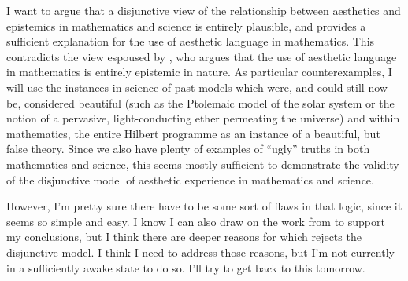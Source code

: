 \documentclass[a4paper,man,natbib]{apa6}
\begin{document}
I want to argue that a disjunctive view of the relationship between aesthetics and epistemics in mathematics
and science is entirely plausible, and provides a sufficient explanation for the use of aesthetic language
in mathematics. This contradicts the view espoused by \cite{todd_unmasking_2008}, who argues that the
use of aesthetic language in mathematics is entirely epistemic in nature. As particular counterexamples,
I will use the instances in science of past models which were, and could still now be, considered beautiful (such
as the Ptolemaic model of the solar system or the notion of a pervasive, light-conducting ether permeating the
universe) and within mathematics, the entire Hilbert programme as an instance of a beautiful, but false theory.
Since we also have plenty of examples of ``ugly'' truths in both mathematics and science, this seems mostly sufficient
to demonstrate the validity of the disjunctive model of aesthetic experience in mathematics and science.

However, I'm pretty sure there have to be some sort of flaws in that logic, since it seems so simple and easy. I know
I can also draw on the work from \cite{inglis_beauty_2015} to support my conclusions, but I think there are deeper
reasons for which \cite{todd_unmasking_2008} rejects the disjunctive model. I think I need to address those reasons,
but I'm not currently in a sufficiently awake state to do so. I'll try to get back to this tomorrow.


\end{document}
